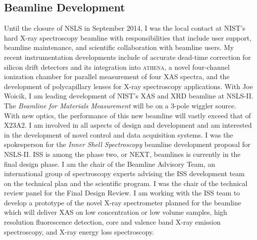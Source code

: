 \documentclass[11pt]{moderncv}
\begin{document}
\subsection{Beamline Development}
%
{Until the closure of NSLS in September 2014, I was the local contact
  at NIST's hard X-ray spectroscopy beamline with responsibilities
  that include user support, beamline maintenance, and scientific
  collaboration with beamline users.  My recent instrumentation
  developments include of accurate dead-time correction for silicon
  drift detectors and its integration into \textsc{athena}, a novel
  four-channel ionization chamber for parallel measurement of four XAS
  spectra, and the development of polycapillary lenses for X-ray
  spectroscopy applications.}
%
%
{With Joe Woicik, I am leading development of NIST's XAS and XRD
  beamline at NSLS-II.  The \textit{Beamline for Materials
    Measurement} will be on a 3-pole wiggler source.  With new optics,
  the performance of this new beamline will vastly exceed that of
  X23A2.  I am involved in all aspects of design and development and
  am interested in the development of novel control and data
  acquisition systems.}
%
%
{I was the spokesperson for the \textit{Inner Shell Spectroscopy}
  beamline development proposal for NSLS-II.  ISS is among the phase
  two, or NEXT, beamlines is currently in the final design phase.  I
  am the chair of the Beamline Advisory Team, an international group
  of spectroscopy experts advising the ISS development team on the
  technical plan and the scientific program.  I was the chair of
  the technical review panel for the Final Design Review.  I am
  working with the ISS team to develop a prototype of the novel X-ray
  spectrometer planned for the beamline which will deliver XAS on low
  concentration or low volume samples, high resolution fluorescence
  detection, core and valence band X-ray emission spectroscopy, and
  X-ray energy loss spectroscopy.}


\end{document}
